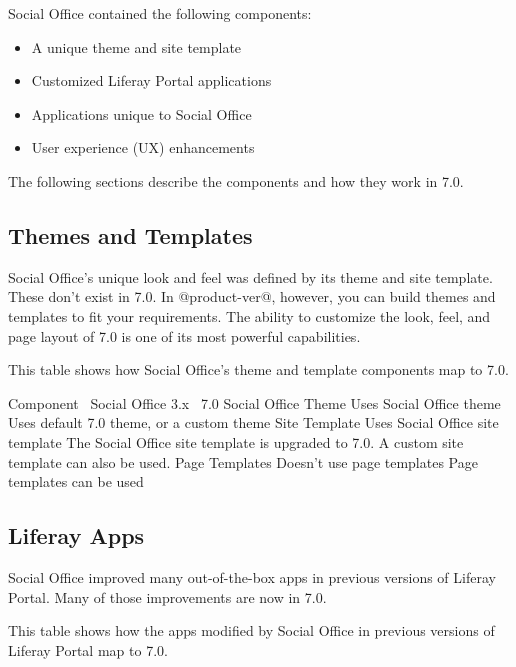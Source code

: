 Social Office contained the following components:

\begin{itemize}
\tightlist
\item
  A unique theme and site template
\item
  Customized Liferay Portal applications
\item
  Applications unique to Social Office
\item
  User experience (UX) enhancements
\end{itemize}

The following sections describe the components and how they work in 7.0.

\subsection{Themes and Templates}\label{themes-and-templates}

Social Office's unique look and feel was defined by its theme and site
template. These don't exist in 7.0. In @product-ver@, however, you can
build themes and templates to fit your requirements. The ability to
customize the look, feel, and page layout of 7.0 is one of its most
powerful capabilities.

This table shows how Social Office's theme and template components map
to 7.0.

Component \textbar{} ~Social Office 3.x \textbar{} ~7.0 \textbar{}
Social Office Theme \textbar{} Uses Social Office theme \textbar{} Uses
default 7.0 theme, or a custom theme \textbar{} Site Template \textbar{}
Uses Social Office site template \textbar{} The Social Office site
template is upgraded to 7.0. A custom site template can also be used.
\textbar{} Page Templates \textbar{} Doesn't use page templates
\textbar{} Page templates can be used \textbar{}

\subsection{Liferay Apps}\label{liferay-apps}

Social Office improved many out-of-the-box apps in previous versions of
Liferay Portal. Many of those improvements are now in 7.0.

This table shows how the apps modified by Social Office in previous
versions of Liferay Portal map to 7.0.

